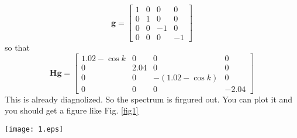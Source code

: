 \documentclass[letterpaper,10pt]{article}
\begin{document}
$$
\mathbf{g}=\begin{bmatrix}
    1 & 0 & 0 & 0 \\
    0 &  1 & 0 &0 \\
    0 &  0 & -1 &0\\
    0 & 0 & 0& -1
\end{bmatrix}$$
so that $$
\mathbf{H}\mathbf{g}=\begin{bmatrix}
    1.02-\cos k & 0 & 0 & 0 \\
    0 &  2.04 & 0 &0 \\
    0 &  0 & -(1.02-\cos k) &0\\
    0 & 0 & 0& -2.04
\end{bmatrix}$$
This is already diagnolized. So the spectrum is firgured out. You can plot it and you should get a figure like \cite{Kim2014} Fig. \ref{fig1}\\
\begin{figure*}
    \texttt{[image: 1.eps]}
    \caption{\textbf{Dispersion of a 1D ferromagnetic chain.} $S=1$ and there is a small magnetic field.}
    \label{fig1}
\end{figure*}


\end{document}
